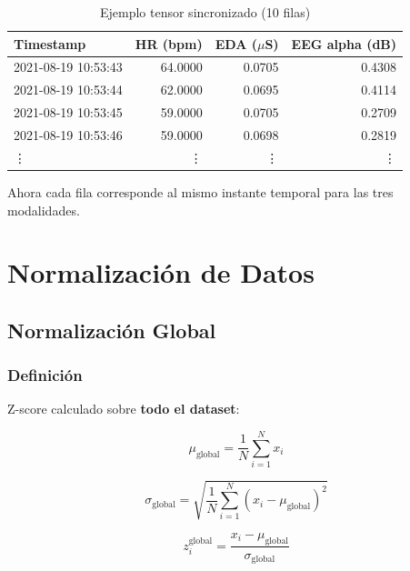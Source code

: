 \documentclass[11pt,twoside,a4paper]{article}
\begin{document}
\begin{table}[H]
\centering
\caption{Ejemplo tensor sincronizado (10 filas)}
\label{tab:tensor}
\begin{tabular}{|l|r|r|r|}
\hline
\textbf{Timestamp} & \textbf{HR (bpm)} & \textbf{EDA ($\mu$S)} & \textbf{EEG alpha (dB)} \\
\hline
2021-08-19 10:53:43 & 64.0000 & 0.0705 & 0.4308 \\
\hline
2021-08-19 10:53:44 & 62.0000 & 0.0695 & 0.4114 \\
\hline
2021-08-19 10:53:45 & 59.0000 & 0.0705 & 0.2709 \\
\hline
2021-08-19 10:53:46 & 59.0000 & 0.0698 & 0.2819 \\
\hline
\vdots & \vdots & \vdots & \vdots \\
\hline
\end{tabular}
\end{table}

Ahora cada fila corresponde al mismo instante temporal para las tres modalidades.

\newpage
\section{Normalización de Datos}

\subsection{Normalización Global}

\subsubsection{Definición}

Z-score calculado sobre \textbf{todo el dataset}:

\begin{equation}
\mu_{\text{global}} = \frac{1}{N} \sum_{i=1}^{N} x_i
\end{equation}

\begin{equation}
\sigma_{\text{global}} = \sqrt{\frac{1}{N} \sum_{i=1}^{N} (x_i - \mu_{\text{global}})^2}
\end{equation}

\begin{equation}
z_i^{\text{global}} = \frac{x_i - \mu_{\text{global}}}{\sigma_{\text{global}}}
\end{equation}
\end{document}
